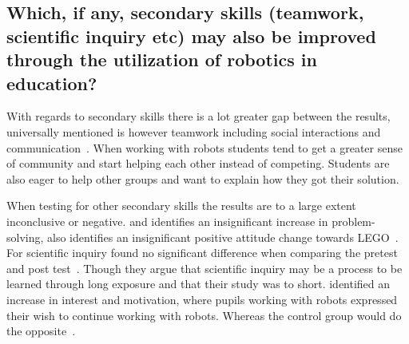 




\subsection{Which, if any, secondary skills (teamwork, scientific inquiry etc) may also be improved through the utilization of robotics in education?}
With regards to secondary skills there is a lot greater gap between the results, 
universally mentioned is however teamwork including social interactions and communication~\cite{mitnik2008autonomous,mitnik2009collaborative,nugent2009use,owens2008lego}.
When working with robots students tend to get a greater sense of community and start helping each other instead of competing. Students are also eager to help other groups and want to explain how they got their solution.

\bigskip\noindent
When testing for other secondary skills the results are to a large extent inconclusive or negative. 
\citeauthor{hussain2006effect} and \citeauthor{lindh2007does} identifies an insignificant increase  in problem-solving, \citeauthor{hussain2006effect} also identifies an insignificant positive attitude change towards LEGO~\cite{hussain2006effect,lindh2007does}. 
For scientific inquiry \citeauthor{williams2007acquisition} found no significant difference when comparing the pretest and post test~\cite{williams2007acquisition}. 
Though they argue that scientific inquiry may be a process to be learned through long exposure and that their study was to short.
 identified an increase in interest and motivation, where pupils working with robots expressed their wish to continue working with robots. Whereas the control group would do the opposite~\cite{nugent2008effect}. 
